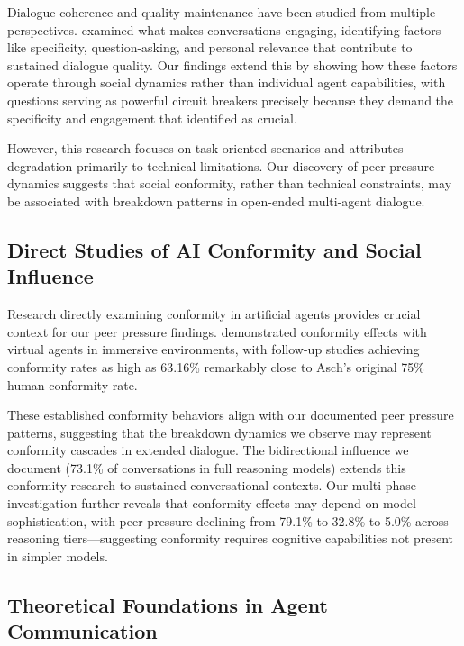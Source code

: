 \documentclass[11pt,letterpaper]{article}
\newcommand{\exponedataPeerPressurePercentage}{79.1\%}
\newcommand{\exponedataBidirectionalPercentage}{73.1\%}
\newcommand{\exptwoPeerPressurePercentage}{32.8\%}
\newcommand{\expthreePeerPressurePercentage}{5.0\%}
\begin{document}
Dialogue coherence and quality maintenance have been studied from multiple perspectives. \citet{see2019makes} examined what makes conversations engaging, identifying factors like specificity, question-asking, and personal relevance that contribute to sustained dialogue quality. Our findings extend this by showing how these factors operate through social dynamics rather than individual agent capabilities, with questions serving as powerful circuit breakers precisely because they demand the specificity and engagement that \citet{see2019makes} identified as crucial.

However, this research focuses on task-oriented scenarios and attributes degradation primarily to technical limitations. Our discovery of peer pressure dynamics suggests that social conformity, rather than technical constraints, may be associated with breakdown patterns in open-ended multi-agent dialogue.

\subsection{Direct Studies of AI Conformity and Social Influence}

Research directly examining conformity in artificial agents provides crucial context for our peer pressure findings. \citet{kyrlitsias2018conformity} demonstrated conformity effects with virtual agents in immersive environments, with follow-up studies achieving conformity rates as high as 63.16\% remarkably close to Asch's original 75\% human conformity rate.

These established conformity behaviors align with our documented peer pressure patterns, suggesting that the breakdown dynamics we observe may represent conformity cascades in extended dialogue. The bidirectional influence we document (\exponedataBidirectionalPercentage{} of conversations in full reasoning models) extends this conformity research to sustained conversational contexts. Our multi-phase investigation further reveals that conformity effects may depend on model sophistication, with peer pressure declining from \exponedataPeerPressurePercentage{} to \exptwoPeerPressurePercentage{} to \expthreePeerPressurePercentage{} across reasoning tiers—suggesting conformity requires cognitive capabilities not present in simpler models.

\subsection{Theoretical Foundations in Agent Communication}
\end{document}
